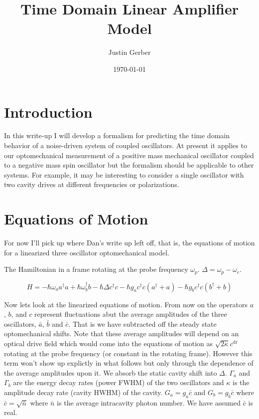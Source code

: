 \documentclass[12pt]{article}
\begin{document}
\title{Time Domain Linear Amplifier Model}
\author{Justin Gerber}
\date{\today}
\maketitle

\section{Introduction}
In this write-up I will develop a formalism for predicting the time domain behavior of a noise-driven system of coupled oscillators. At present it applies to our optomechanical measurement of a positive mass mechanical oscillator coupled to a negative mass spin oscillator but the formalism should be applicable to other systems. For example, it may be interesting to consider a single oscillator with two cavity drives at different frequencies or polarizations.

\section{Equations of Motion}

For now I'll pick up where Dan's write up left off, that is, the equations of motion for a linearized three oscillator optomechanical model.

The Hamiltonian in a frame rotating at the probe frequency $\omega_p$. $\Delta = \omega_p-\omega_c$.

\begin{equation}
H = -\hbar \omega_a a^{\dag} a + \hbar \omega_b^{\dag}b - \hbar\Delta c^{\dag} c - \hbar g_a c^{\dag}c(a^{\dag} +a) -\hbar g_b c^{\dag} c(b^{\dag}+b)
\end{equation}

Now lets look at the linearized equations of motion. From now on the operators $a$, $b$, and $c$ represent fluctuations abut the average amplitudes of the three oscillators, $\bar{a}$, $\bar{b}$ and $\bar{c}$. That is we have subtracted off the steady state optomechanical shifts. Note that these average amplitudes will depend on an optical drive field which would come into the equations of motion as $\sqrt{2\kappa}c^{\text{dr}}$ rotating at the probe frequency (or constant in the rotating frame). However this term won't show up explictly in what follows but only through the dependence of the average amplitudes upon it. We absorb the static cavity shift into $\Delta$. $\Gamma_a$ and $\Gamma_b$ are the energy decay rates (power FWHM) of the two oscillators and $\kappa$ is the amplitude decay rate (cavity HWHM) of the cavity. $G_a = g_a \bar{c}$ and $G_b = g_b \bar{c}$ where $\bar{c} = \sqrt{\bar{n}}$ where $\bar{n}$ is the average intracavity photon number. We have assumed $\bar{c}$ is real.
\end{document}
